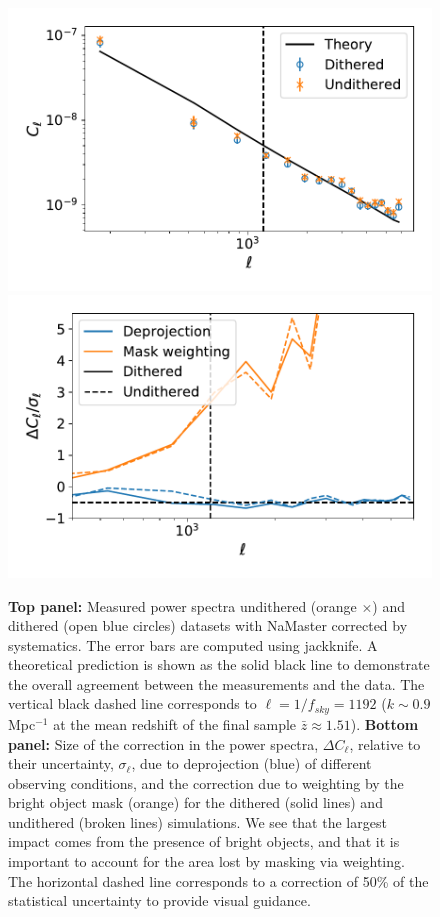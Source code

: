 \documentclass[\docopts]{\docclass}
\begin{document}
\begin{figure}
\centering
\includegraphics[width=0.9\columnwidth]{Cl_results_2019_comp}
\includegraphics[width=0.9\columnwidth]{systematics_comp_abs}
\caption{{\bf Top panel:} Measured power spectra undithered (orange $\times$) and dithered (open blue circles) datasets with NaMaster corrected by systematics. The error bars are computed using jackknife. A theoretical prediction is shown as the solid black line to demonstrate the overall agreement between the measurements and the data. The vertical black dashed line corresponds to $\ell = 1/f_{sky}=1192$ ($k \sim 0.9$ Mpc$^{-1}$ at the mean redshift of the final sample $\bar{z} \approx 1.51$). {\bf Bottom panel:} Size of the correction in the power spectra, $\Delta C_{\ell}$, relative to their uncertainty, $\sigma_{\ell}$, due to deprojection (blue) of different observing conditions, and the correction due to weighting by the bright object mask (orange) for the dithered (solid lines) and undithered (broken lines) simulations. We see that the largest impact comes from the presence of bright objects, and that it is important to account for the area lost by masking via weighting. The horizontal dashed line corresponds to a correction of 50\% of the statistical uncertainty to provide visual guidance.} 
\label{fig:power_spectra}
\end{figure}
\end{document}
